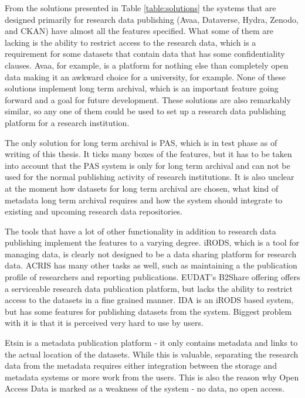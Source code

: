 From the solutions presented in Table \ref{table:solutions} the systems that
are designed primarily for research data publishing (Avaa, Dataverse, Hydra,
Zenodo, and CKAN) have almost all the features specified. What some of
them are lacking is the ability to restrict access to the research data, which
is a requirement for some datasets that contain data that has some
confidentiality clauses. Avaa, for example, is a platform for nothing else than
completely open data making it an awkward choice for a university, for example.
None of these solutions implement long term archival,
which is an important feature going forward and a goal for future development.
These solutions are also remarkably similar, so any one of them could be used
to set up a research data publishing platform for a research institution.

The only solution for long term archival is PAS, which is in test phase as of
writing of this thesis. It ticks many boxes of the features, but it has to be
taken into account that the PAS system is only for long term archival and
can not be used for the normal publishing activity of research institutions.
It is also unclear at the moment how datasets for long term archival are
chosen, what kind of metadata long term archival requires and how the system
should integrate to existing and upcoming research data repositories.

The tools that have a lot of other functionality in addition to research data
publishing implement the features to a varying degree. iRODS, which is a tool
for managing data, is clearly not designed to be a data sharing platform for
research data. ACRIS has many other tasks as well, such as maintaining a the
publication profile of researchers and reporting publications. EUDAT's B2Share
offering offers a serviceable research data publication platform, but lacks the
ability to restrict access to the datasets in a fine grained manner. IDA is an iRODS based system, but
has some features for publishing datasets from the system. Biggest problem with
it is that it is perceived very hard to use by users.

Etsin is a metadata publication platform - it only contains metadata and links
to the actual location of the datasets. While this is valuable, separating the
research data from the metadata requires either integration between the storage
and metadata systems or more work from the users. This is also the reason why
Open Access Data is marked as a weakness of the system - no data, no open access.

